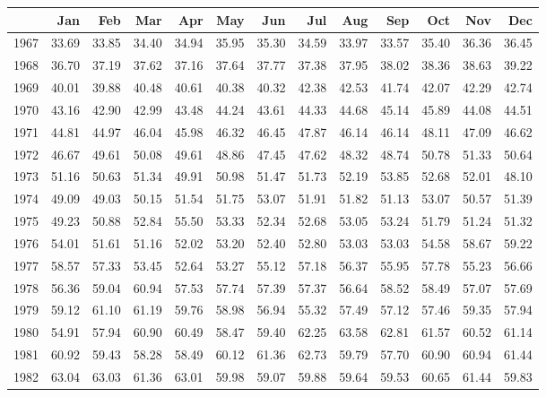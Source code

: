 \begin{longtable}{rrrrrrrrrrrrr}
  \hline
 & Jan & Feb & Mar & Apr & May & Jun & Jul & Aug & Sep & Oct & Nov & Dec \\ 
  \hline
1967 & 33.69 & 33.85 & 34.40 & 34.94 & 35.95 & 35.30 & 34.59 & 33.97 & 33.57 & 35.40 & 36.36 & 36.45 \\ 
  1968 & 36.70 & 37.19 & 37.62 & 37.16 & 37.64 & 37.77 & 37.38 & 37.95 & 38.02 & 38.36 & 38.63 & 39.22 \\ 
  1969 & 40.01 & 39.88 & 40.48 & 40.61 & 40.38 & 40.32 & 42.38 & 42.53 & 41.74 & 42.07 & 42.29 & 42.74 \\ 
  1970 & 43.16 & 42.90 & 42.99 & 43.48 & 44.24 & 43.61 & 44.33 & 44.68 & 45.14 & 45.89 & 44.08 & 44.51 \\ 
  1971 & 44.81 & 44.97 & 46.04 & 45.98 & 46.32 & 46.45 & 47.87 & 46.14 & 46.14 & 48.11 & 47.09 & 46.62 \\ 
  1972 & 46.67 & 49.61 & 50.08 & 49.61 & 48.86 & 47.45 & 47.62 & 48.32 & 48.74 & 50.78 & 51.33 & 50.64 \\ 
  1973 & 51.16 & 50.63 & 51.34 & 49.91 & 50.98 & 51.47 & 51.73 & 52.19 & 53.85 & 52.68 & 52.01 & 48.10 \\ 
  1974 & 49.09 & 49.03 & 50.15 & 51.54 & 51.75 & 53.07 & 51.91 & 51.82 & 51.13 & 53.07 & 50.57 & 51.39 \\ 
  1975 & 49.23 & 50.88 & 52.84 & 55.50 & 53.33 & 52.34 & 52.68 & 53.05 & 53.24 & 51.79 & 51.24 & 51.32 \\ 
  1976 & 54.01 & 51.61 & 51.16 & 52.02 & 53.20 & 52.40 & 52.80 & 53.03 & 53.03 & 54.58 & 58.67 & 59.22 \\ 
  1977 & 58.57 & 57.33 & 53.45 & 52.64 & 53.27 & 55.12 & 57.18 & 56.37 & 55.95 & 57.78 & 55.23 & 56.66 \\ 
  1978 & 56.36 & 59.04 & 60.94 & 57.53 & 57.74 & 57.39 & 57.37 & 56.64 & 58.52 & 58.49 & 57.07 & 57.69 \\ 
  1979 & 59.12 & 61.10 & 61.19 & 59.76 & 58.98 & 56.94 & 55.32 & 57.49 & 57.12 & 57.46 & 59.35 & 57.94 \\ 
  1980 & 54.91 & 57.94 & 60.90 & 60.49 & 58.47 & 59.40 & 62.25 & 63.58 & 62.81 & 61.57 & 60.52 & 61.14 \\ 
  1981 & 60.92 & 59.43 & 58.28 & 58.49 & 60.12 & 61.36 & 62.73 & 59.79 & 57.70 & 60.90 & 60.94 & 61.44 \\ 
  1982 & 63.04 & 63.03 & 61.36 & 63.01 & 59.98 & 59.07 & 59.88 & 59.64 & 59.53 & 60.65 & 61.44 & 59.83 \\ 

\end{longtable}
